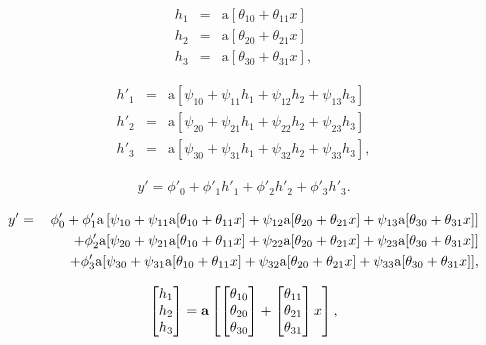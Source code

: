 \documentclass[letterpaper,twoside,openany, titlepage,oldfontcommands,titles,dvipsnames]{memoir}
\begin{document}
\begin{eqnarray}\label{eq:dnn_three_layer_in}
 h_{1} &=& \mbox{a}[\theta_{10} + \theta_{11}x] \nonumber \\
 h_{2} &=& \mbox{a}[\theta_{20} + \theta_{21}x] \nonumber \\
 h_{3} &=& \mbox{a}[\theta_{30} + \theta_{31}x],
 \end{eqnarray}

\begin{eqnarray}\label{eq:dnn_three_layer_middle2}
 h'_{1} &=& \mbox{a}[\psi_{10} + \psi_{11}h_{1}+ \psi_{12}h_{2}+ \psi_{13}h_{3}] \nonumber \\
 h'_{2} &=& \mbox{a}[\psi_{20} + \psi_{21}h_{1}+ \psi_{22}h_{2}+ \psi_{23}h_{3}] \nonumber \\
 h'_{3} &=& \mbox{a}[\psi_{30} + \psi_{31}h_{1}+ \psi_{32}h_{2}+ \psi_{33}h_{3}],
 \end{eqnarray}

\begin{eqnarray}\label{eq:dnn_three_layer_out}
 y' = \phi'_{0}+\phi'_{1}h'_{1}+\phi'_{2}h'_{2}+\phi'_{3}h'_{3}.
 \end{eqnarray}

\begin{eqnarray}\label{eq:dnn_expanded}
 y' &=& \phi'_{0}+\phi'_{1}\mbox{a}\left[\psi_{10} + \psi_{11}\mbox{a}[\theta_{10} + \theta_{11}x] + \psi_{12}\mbox{a}[\theta_{20} + \theta_{21}x]+ \psi_{13}\mbox{a}[\theta_{30} + \theta_{31}x]\right]\nonumber \\
 &&\hspace{0.55cm}+\phi'_{2}\mbox{a}[\psi_{20} + \psi_{21}\mbox{a}[\theta_{10} + \theta_{11}x] + \psi_{22}\mbox{a}[\theta_{20} + \theta_{21}x]+ \psi_{23}\mbox{a}[\theta_{30} + \theta_{31}x]] \nonumber\\
 &&\hspace{0.55cm}+\phi'_{3}\mbox{a}[\psi_{30} + \psi_{31}\mbox{a}[\theta_{10} + \theta_{11}x] + \psi_{32}\mbox{a}[\theta_{20} + \theta_{21}x]+ \psi_{33}\mbox{a}[\theta_{30} + \theta_{31}x]],\nonumber \\
 \end{eqnarray}

\begin{eqnarray}
  \begin{bmatrix}
  h_{1} \\ h_{2} \\ h_{3}
  \end{bmatrix}
  = \mbox{\bf a}\left[\begin{bmatrix}\theta_{10}\\ \theta_{20}\\ \theta_{30} \end{bmatrix}+\begin{bmatrix}\theta_{11}\\\theta_{21}\\\theta_{31}\end{bmatrix}x\right],
 \end{eqnarray}
\end{document}
